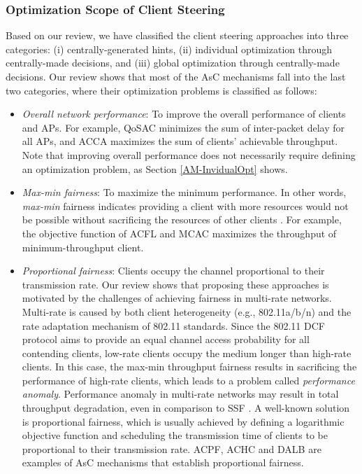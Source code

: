 \subsubsection{\textbf{Optimization Scope of Client Steering}} 
\label{asc_opt_scope_cl_ste}
Based on our review, we have classified the client steering approaches into three categories: (i) centrally-generated hints, (ii) individual optimization through centrally-made decisions, and (iii) global optimization through centrally-made decisions. 
Our review shows that most of the AsC mechanisms fall into the last two categories, where their optimization problems is classified as follows:
%
\begin{itemize}
	\item \textit{Overall network performance}: To improve the overall performance of clients and APs. 
	For example, QoSAC minimizes the sum of inter-packet delay for all APs, and ACCA  maximizes the sum of clients' achievable throughput.
	Note that improving overall performance does not necessarily require defining an optimization problem, as Section \ref{AM-InvidualOpt} shows.
	\item \textit{Max-min fairness}: To maximize the minimum performance. In other words, \textit{max-min} fairness indicates providing a client with more resources would not be possible without sacrificing the resources of other clients \cite{Bonald2006}. 
	For example, the objective function of ACFL and MCAC maximizes the throughput of minimum-throughput client.
	\item \textit{Proportional fairness}: Clients occupy the channel proportional to their transmission rate.
	Our review shows that proposing these approaches is motivated by the challenges of achieving fairness in multi-rate networks. 
	Multi-rate is caused by both client heterogeneity (e.g.,  802.11a/b/n) and the rate adaptation mechanism of 802.11 standards.
	Since the 802.11 DCF protocol aims to provide an equal channel access probability for all contending clients, low-rate clients occupy the medium longer than high-rate clients.
	In this case, the max-min throughput fairness results in sacrificing the performance of high-rate clients, which leads to a problem called \textit{performance anomaly}. 
	Performance anomaly in multi-rate networks may result in total throughput degradation, even in comparison to SSF \cite{DAM-G-5,bellalta2016interactions,802.11n-AP-Association-2014,SSF}. 
	A well-known solution is proportional fairness, which is usually achieved by defining a logarithmic objective function and scheduling the transmission time of clients to be proportional to their transmission rate. 
	ACPF, ACHC and DALB are examples of AsC mechanisms that establish proportional fairness. 
\end{itemize}



